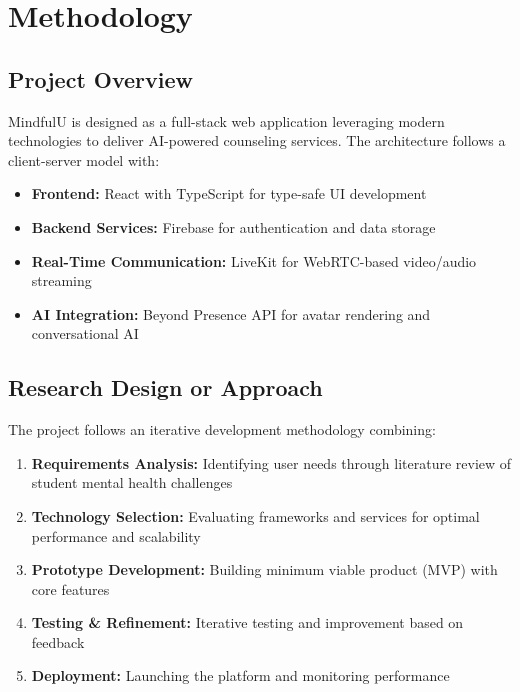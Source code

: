 \documentclass[11pt,a4paper]{article}
\begin{document}
\newpage

\section{Methodology}

\subsection{Project Overview}
MindfulU is designed as a full-stack web application leveraging modern technologies to deliver AI-powered counseling services. The architecture follows a client-server model with:

\begin{itemize}
    \item \textbf{Frontend:} React with TypeScript for type-safe UI development
    \item \textbf{Backend Services:} Firebase for authentication and data storage
    \item \textbf{Real-Time Communication:} LiveKit for WebRTC-based video/audio streaming
    \item \textbf{AI Integration:} Beyond Presence API for avatar rendering and conversational AI
\end{itemize}

\subsection{Research Design or Approach}
The project follows an iterative development methodology combining:

\begin{enumerate}
    \item \textbf{Requirements Analysis:} Identifying user needs through literature review of student mental health challenges
    \item \textbf{Technology Selection:} Evaluating frameworks and services for optimal performance and scalability
    \item \textbf{Prototype Development:} Building minimum viable product (MVP) with core features
    \item \textbf{Testing \& Refinement:} Iterative testing and improvement based on feedback
    \item \textbf{Deployment:} Launching the platform and monitoring performance
\end{enumerate}
\end{document}
